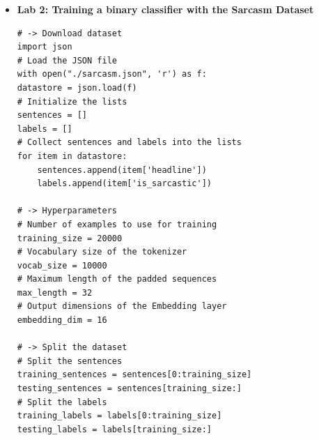 \documentclass[20pt]{article}
\begin{document}
\begin{itemize}
\begin{verbatim}
# -> Train the Model
num_epochs = 10
# Train the model
model.fit(padded, training_labels_final, epochs=num_epochs, validation_data=(testing_padded, testing_labels_final))

# -> Visualize Word Embeddings
# Get the embedding layer from the model (i.e. first layer)
embedding_layer = model.layers[0]
# Get the weights of the embedding layer
embedding_weights = embedding_layer.get_weights()[0]
# Print the shape. Expected is (vocab_size, embedding_dim)
print(embedding_weights.shape) 
# Get the index-word dictionary
reverse_word_index = tokenizer.index_word
# loop to generate the files. You will loop vocab_size-1 times, skipping the 0 key because it is just for the padding
import io
# Open writeable files
out_v = io.open('vecs.tsv', 'w', encoding='utf-8')
out_m = io.open('meta.tsv', 'w', encoding='utf-8')
# Initialize the loop. Start counting at `1` because `0` is just for the padding
for word_num in range(1, vocab_size):
	# Get the word associated at the current index
	word_name = reverse_word_index[word_num]
	# Get the embedding weights associated with the current index
	word_embedding = embedding_weights[word_num]
	# Write the word name
	out_m.write(word_name + "\n")
	# Write the word embedding
	out_v.write('\t'.join([str(x) for x in word_embedding]) + "\n")
# Close the files
out_v.close()
out_m.close()
# Now you can go to the Tensorflow Embedding Projector and load the two files
# you downloaded to see the visualization. You can search for words like worst and
# fantastic and see the other words closely located to these.
		\end{verbatim}
		\item \textbf{Lab 2: Training a binary classifier with the Sarcasm Dataset}
		\begin{verbatim}
# -> Download dataset
import json
# Load the JSON file
with open("./sarcasm.json", 'r') as f:
datastore = json.load(f)
# Initialize the lists
sentences = []
labels = []
# Collect sentences and labels into the lists
for item in datastore:
	sentences.append(item['headline'])
	labels.append(item['is_sarcastic'])

# -> Hyperparameters
# Number of examples to use for training
training_size = 20000
# Vocabulary size of the tokenizer
vocab_size = 10000
# Maximum length of the padded sequences
max_length = 32
# Output dimensions of the Embedding layer
embedding_dim = 16

# -> Split the dataset
# Split the sentences
training_sentences = sentences[0:training_size]
testing_sentences = sentences[training_size:]
# Split the labels
training_labels = labels[0:training_size]
testing_labels = labels[training_size:]


\end{verbatim}
\end{itemize}
\end{document}
